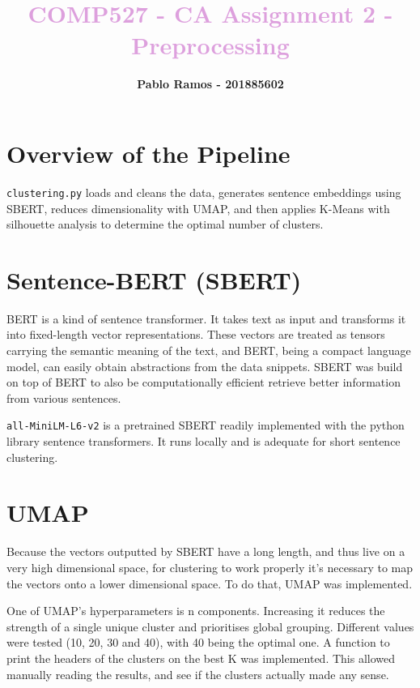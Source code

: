\documentclass[11pt]{article}
\title{\textcolor{Plum}{\textbf{COMP527 - CA Assignment 2 - Preprocessing}}}
\author{\textbf{Pablo Ramos - 201885602}}
\begin{document}
%
%
\maketitle
{\setlength{\parindent}{0mm}{\color{Plum} \rule{\linewidth}{0.5mm}}} %

\section{Overview of the Pipeline}

\texttt{clustering.py} loads and cleans the data, generates sentence embeddings using SBERT, reduces dimensionality with UMAP, and then applies K-Means with silhouette analysis to determine the optimal number of clusters.

\section{Sentence-BERT (SBERT)}

BERT is a kind of sentence transformer. It takes text as input and transforms it into fixed-length vector representations. These vectors are treated as tensors carrying the semantic meaning of the text, and BERT, being a compact language model, can easily obtain abstractions from the data snippets. SBERT was build on top of BERT to also be computationally efficient retrieve better information from various sentences.

\texttt{all-MiniLM-L6-v2} is a pretrained SBERT readily implemented with the python library sentence transformers. It runs locally and is adequate for short sentence clustering.

\section{UMAP}

Because the vectors outputted by SBERT have a long length, and thus live on a very high dimensional space, for clustering to work properly it's necessary to map the vectors onto a lower dimensional space. To do that, UMAP was implemented.

One of UMAP's hyperparameters is n components. Increasing it reduces the strength of a single unique cluster and prioritises global grouping. Different values were tested (10, 20, 30 and 40), with 40 being the optimal one. A function to print the headers of the clusters on the best K was implemented. This allowed manually reading the results, and see if the clusters actually made any sense.
\end{document}
